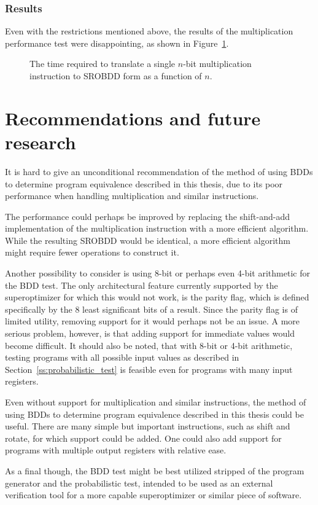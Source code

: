\documentclass[a4paper,11pt]{kth-mag}
\begin{document}
\subsection{Results}

Even with the restrictions mentioned above, the results of the multiplication performance test were disappointing, as shown in Figure~\ref{fig:performance_mul}.

\begin{figure}
\centering

\caption{The time required to translate a single $n$-bit multiplication instruction to SROBDD form as a function of $n$.}
\label{fig:performance_mul}
\end{figure}


\chapter{Recommendations and future research}
\label{ch:recommendations_future_research}

It is hard to give an unconditional recommendation of the method of using BDDs to determine program equivalence described in this thesis, due to its poor performance when handling multiplication and similar instructions.

The performance could perhaps be improved by replacing the shift-and-add implementation of the multiplication instruction with a more efficient algorithm.
While the resulting SROBDD would be identical, a more efficient algorithm might require fewer operations to construct it.

Another possibility to consider is using 8-bit or perhaps even 4-bit arithmetic for the BDD test.
The only architectural feature currently supported by the superoptimizer for which this would not work, is the parity flag, which is defined specifically by the 8 least significant bits of a result.
Since the parity flag is of limited utility, removing support for it would perhaps not be an issue.
A more serious problem, however, is that adding support for immediate values would become difficult.
It should also be noted, that with 8-bit or 4-bit arithmetic, testing programs with all possible input values as described in Section~\ref{ss:probabilistic_test} is feasible even for programs with many input registers.

Even without support for multiplication and similar instructions, the method of using BDDs to determine program equivalence described in this thesis could be useful.
There are many simple but important instructions, such as shift and rotate, for which support could be added.
One could also add support for programs with multiple output registers with relative ease.

As a final though, the BDD test might be best utilized stripped of the program generator and the probabilistic test, intended to be used as an external verification tool for a more capable superoptimizer or similar piece of software.



\end{document}
